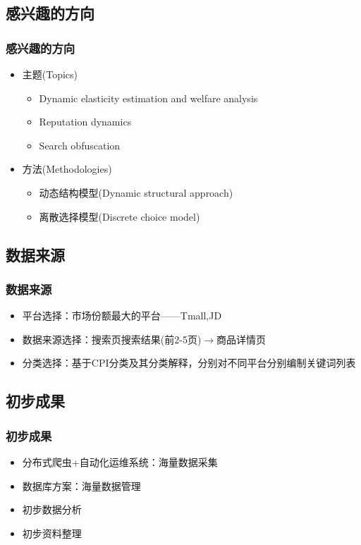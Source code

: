 \documentclass{beamer}
\begin{document}
\subsection{感兴趣的方向}
\begin{frame}
\frametitle{感兴趣的方向}
\begin{itemize}
\item 主题(Topics)
\begin{itemize}
  \item Dynamic elasticity estimation and welfare analysis
  \item Reputation dynamics
  \item Search obfuscation
\end{itemize}
\item 方法(Methodologies)
\begin{itemize}
  \item 动态结构模型(Dynamic structural approach)
  \item 离散选择模型(Discrete choice model)
\end{itemize}
\end{itemize}
\end{frame}

\subsection{数据来源}
\begin{frame}
\frametitle{数据来源}
\begin{itemize}
  \item 平台选择：市场份额最大的平台——Tmall,JD
  \item 数据来源选择：搜索页搜索结果(前2-5页)$\to$商品详情页
  \item 分类选择：基于CPI分类及其分类解释，分别对不同平台分别编制关键词列表
\end{itemize}
\end{frame}

\subsection{初步成果}
\begin{frame}
\frametitle{初步成果}
\begin{itemize}
  \item 分布式爬虫+自动化运维系统：海量数据采集\footnotemark
  \item 数据库方案：海量数据管理\footnotemark
  \item 初步数据分析\footnotemark
  \item 初步资料整理\footnotemark
\end{itemize}
\end{frame}
\end{document}
